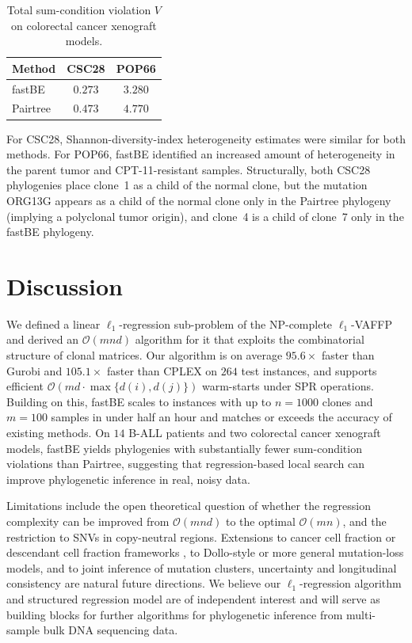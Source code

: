 \documentclass[11pt]{article}
\begin{document}
\begin{table}[h]
\centering
\caption{Total sum-condition violation $V$ on colorectal cancer xenograft models.}
\label{tab:pdx}
\begin{tabular}{lcc}
\toprule
Method & CSC28 & POP66 \\
\midrule
fastBE & $0.273$ & $3.280$ \\
Pairtree & $0.473$ & $4.770$ \\
\bottomrule
\end{tabular}
\end{table}

For CSC28, Shannon-diversity-index heterogeneity estimates were similar for both methods. For POP66, fastBE identified an increased amount of heterogeneity in the parent tumor and CPT-11-resistant samples. Structurally, both CSC28 phylogenies place clone~1 as a child of the normal clone, but the mutation ORG13G appears as a child of the normal clone only in the Pairtree phylogeny (implying a polyclonal tumor origin), and clone~4 is a child of clone~7 only in the fastBE phylogeny.

\section{Discussion}

We defined a linear $\ell_1$-regression sub-problem of the NP-complete $\ell_1$-VAFFP and derived an $\mathcal{O}(mnd)$ algorithm for it that exploits the combinatorial structure of clonal matrices. Our algorithm is on average $95.6\times$ faster than Gurobi and $105.1\times$ faster than CPLEX on $264$ test instances, and supports efficient $\mathcal{O}(md \cdot \max\{d(i),d(j)\})$ warm-starts under SPR operations. Building on this, fastBE scales to instances with up to $n=1000$ clones and $m = 100$ samples in under half an hour and matches or exceeds the accuracy of existing methods. On $14$ B-ALL patients and two colorectal cancer xenograft models, fastBE yields phylogenies with substantially fewer sum-condition violations than Pairtree, suggesting that regression-based local search can improve phylogenetic inference in real, noisy data.

Limitations include the open theoretical question of whether the regression complexity can be improved from $\mathcal{O}(mnd)$ to the optimal $\mathcal{O}(mn)$, and the restriction to SNVs in copy-neutral regions. Extensions to cancer cell fraction or descendant cell fraction frameworks \cite{elkebir2016copynumber,bonizzoni2014perfect}, to Dollo-style \cite{dollo1893,elkebir2018spruce,jahn2016trisicell} or more general mutation-loss models, and to joint inference of mutation clusters, uncertainty and longitudinal consistency are natural future directions. We believe our $\ell_1$-regression algorithm and structured regression model are of independent interest and will serve as building blocks for further algorithms for phylogenetic inference from multi-sample bulk DNA sequencing data.



\end{document}
